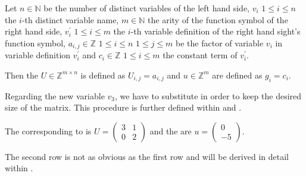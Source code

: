 \begin{definition}
	\label{def:update}
	Let $n \in \mathbb{N}$ be the number of distinct variables of the left hand side, $v_i$ $1 \le i \le n$ the $i$-th distinct		variable name, $m \in \mathbb{N}$ the arity of the function symbol of the right hand side, $v^\prime_i$ $1 \le i \le m$ the $i$-th variable definition of the right hand sight's function symbol, $a_{i,j} \in \mathbb{Z}$ $1 \le i \le n$ $1 \le j \le m$ be the factor of variable $v_i$ in variable definition $v^\prime_i$ and $c_i \in \mathbb{Z}$ $1 \le i \le m$ the constant term of $v^\prime_i$. \newline
	
	Then the \updatematrix $U \in \mathbb{Z}^{m \times n}$ is defined as $U_{i,j}=a_{i,j}$ and \updateconstants $u \in \mathbb{Z}^m$ are defined as $g_i = c_i$.
	
	Regarding the new variable $v_3$, we have to substitute in order to keep the desired size of the matrix. This procedure is further defined within  and .
\end{definition}
\begin{example}
	The corresponding \updatematrix to  is $U = \begin{pmatrix} 3 & 1 \\ 0 & 2 \end{pmatrix}$ and the \updateconstants are $u = \begin{pmatrix} 0 \\ -5 \end{pmatrix}$.
	
	The second row is not as obvious as the first row and will be derived in detail within .
\end{example}

